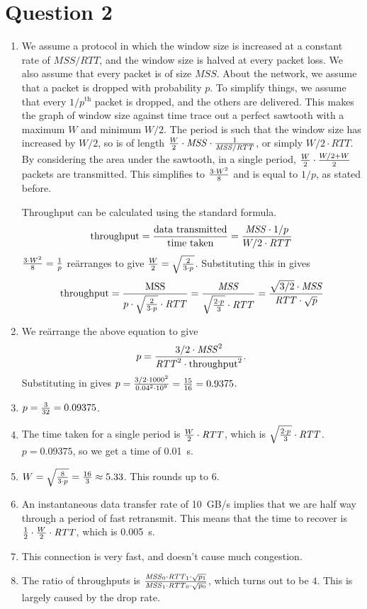 \documentclass{article}
\begin{document}
\section*{Question 2}
\begin{enumerate}
  \item We assume a protocol in which the window size is increased at a constant rate of $\mathit{MSS} / \mathit{RTT}$, and the window size is halved at every packet loss. We also assume that every packet is of size $\mathit{MSS}$. About the network, we assume that a packet is dropped with probability $p$. To simplify things, we assume that every $1/p^{\mathrm{th}}$ packet is dropped, and the others are delivered. This makes the graph of window size against time trace out a perfect sawtooth with a maximum $W$ and minimum $W/2$. The period is such that the window size has increased by $W/2$, so is of length ${W \over 2} \cdot \mathit{MSS} \cdot {1 \over \mathit{MSS} / \mathit{RTT}}$, or simply $W/2 \cdot \mathit{RTT}$. By considering the area under the sawtooth, in a single period, ${W \over 2} \cdot {W/2 + W \over 2}$ packets are transmitted. This simplifies to $3 \cdot W^2 \over 8$ and is equal to $1/p$, as stated before.

    Throughput can be calculated using the standard formula.
    \[\textrm{throughput} = {\textrm{data transmitted} \over \textrm{time taken}} = {\mathit{MSS} \cdot 1/p \over W/2 \cdot \mathit{RTT}}\]
    ${3 \cdot W^2 \over 8} = {1 \over p}$ re\"arranges to give ${W \over 2} = \sqrt{2 \over 3 \cdot p}$. Substituting this in gives
    \[\textrm{throughput} = {\mathrm{MSS} \over p \cdot \sqrt{2 \over 3 \cdot p} \cdot \mathit{RTT}} = {\mathit{MSS} \over \sqrt{2 \cdot p \over 3} \cdot \mathit{RTT}} = {\sqrt{3/2} \cdot \mathit{MSS} \over \mathit{RTT} \cdot \sqrt p}\]
  \item We re\"arrange the above equation to give
    \[p = {3/2 \cdot \mathit{MSS}^2 \over \mathit{RTT}^2 \cdot \mathrm{throughput}^2}.\]
    Substituting in gives $p = {3/2 \cdot 1000^2 \over 0.04^2 \cdot 10^9} = {15 \over 16} = 0.9375$.
  \item $p = {3 \over 32} = 0.09375$.
  \item The time taken for a single period is ${W \over 2} \cdot \mathit{RTT}$, which is $\sqrt{2 \cdot p \over 3} \cdot \mathit{RTT}$. $p = 0.09375$, so we get a time of \SI{0.01}{s}.
  \item $W = \sqrt{8 \over 3 \cdot p} = {16 \over 3} \approx 5.33$. This rounds up to $6$.
  \item An instantaneous data transfer rate of \SI{10}{GB/s} implies that we are half way through a period of fast retransmit. This means that the time to recover is ${1 \over 2} \cdot {W \over 2} \cdot \mathit{RTT}$, which is \SI{0.005}{s}.
  \item This connection is very fast, and doesn't cause much congestion.
  \item The ratio of throughputs is ${\mathit{MSS}_0 \cdot \mathit{RTT}_1 \cdot \sqrt{p_1} \over \mathit{MSS}_1 \cdot \mathit{RTT}_0 \cdot \sqrt{p_0}}$, which turns out to be $4$. This is largely caused by the drop rate.
\end{enumerate}
\end{document}
